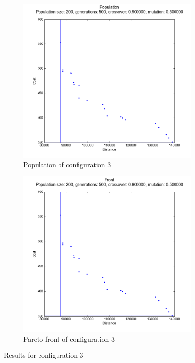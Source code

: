 \documentclass[
]{article}
\begin{document}
\begin{figure}[H]
    \centering
    \begin{subfigure}[b]{0.45\textwidth}
        \includegraphics[width=\textwidth]{config-3-population.png}
        \caption{Population of configuration 3}
    \end{subfigure}
    \begin{subfigure}[b]{0.45\textwidth}
        \includegraphics[width=\textwidth]{config-3-front.png}
        \caption{Pareto-front of configuration 3}
    \end{subfigure}
    \caption{Results for configuration 3}
    \label{config-3}
\end{figure}
\end{document}
